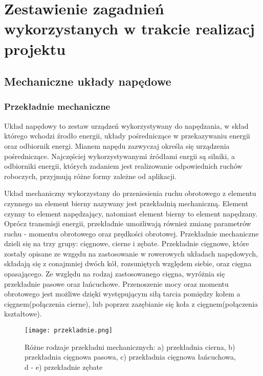 \chapter{Zestawienie zagadnień wykorzystanych w trakcie realizacj projektu}
\label{cha:Zestawienie zagadnień wykorzystanych w pracy}

\section{Mechaniczne układy napędowe}
\subsection{Przekładnie mechaniczne}
Układ napędowy to zestaw urządzeń wykorzystywany do napędzania, w skład którego wchodzi źrodło energii, układy pośredniczące w przekazywaniu energii oraz odbiornik energi. Mianem napędu zazwyczaj określa się urządzenia pośredniczące. Najczęściej wykorzystywanymi źródłami enrgii są silniki, a odbiorniki energii, których zadaniem jest realizowanie odpowiednich ruchów roboczych, przyjmują różne formy zależne od aplikacji.

Układ mechaniczny wykorzystany do przeniesienia ruchu obrotowego z elementu czynnego na element bierny nazywany jest przekładnią mechaniczną. Element czynny to element napędzający, natomiast element bierny to element napędzany. Oprócz transmisji energii, przekładnie umożliwają również zmianę parametrów ruchu - momentu obrotowego oraz prędkości obrotowej. Przekładnie mechaniczne dzieli się na trzy grupy: cięgnowe, cierne i zębate. Przekładnie cięgnowe, które zostały opisane ze wzgędu na zastosowanie w rowerowych układach napędowych, składają się z conajmniej dwóch kół, rozsuniętych względem siebie, oraz cięgna opasającego. Ze względu na rodzaj zastosowanego cięgna, wyróżnia się przekładnie pasowe oraz łańcuchowe. Przenoszenie mocy oraz momentu obrotowego jest możliwe dzięki występującym siłą tarcia pomiędzy kołem a cięgnem(połączenia cierne), lub poprzez zazębianie się koła z cięgnem(połączenia kształtowe).
\begin{figure}[h]
    \centering
    \texttt{[image: przekladnie.png]}
    \caption{Różne rodzaje przekładni mechanicznych: a) przekładnia cierna, b) przekładnia cięgnowa pasowa, c) przekładnia cięgnowa łańcuchowa, d - e) przekładnie zębate }
    \label{fig:przekladnia}
\end{figure}

